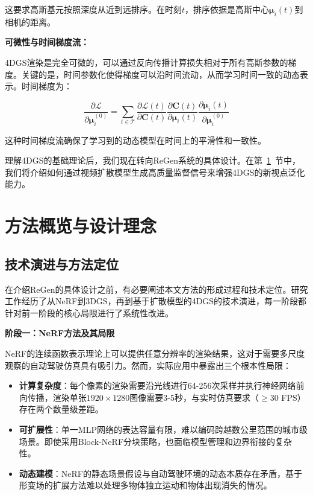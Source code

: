 这要求高斯基元按照深度从近到远排序。在时刻$t$，排序依据是高斯中心$\boldsymbol{\mu}_i(t)$到相机的距离。

\textbf{可微性与时间梯度流：}

4DGS渲染是完全可微的，可以通过反向传播计算损失相对于所有高斯参数的梯度。关键的是，时间参数化使得梯度可以沿时间流动，从而学习时间一致的动态表示。时间梯度为：

\begin{equation}
\frac{\partial \mathcal{L}}{\partial \boldsymbol{\mu}_i^{(0)}} = \sum_{t \in \mathcal{T}} \frac{\partial \mathcal{L}(t)}{\partial \mathbf{C}(t)} \frac{\partial \mathbf{C}(t)}{\partial \boldsymbol{\mu}_i(t)} \frac{\partial \boldsymbol{\mu}_i(t)}{\partial \boldsymbol{\mu}_i^{(0)}}
\label{eq:temporal_gradient}
\end{equation}

这种时间梯度流确保了学习到的动态模型在时间上的平滑性和一致性。

理解4DGS的基础理论后，我们现在转向ReGen系统的具体设计。在第~\ref{sec:method_overview}~节中，我们将介绍如何通过视频扩散模型生成高质量监督信号来增强4DGS的新视点泛化能力。

\section{方法概览与设计理念}
\label{sec:method_overview}

\subsection{技术演进与方法定位}

在介绍ReGen的具体设计之前，有必要阐述本文方法的形成过程和技术定位。研究工作经历了从NeRF到3DGS，再到基于扩散模型的4DGS的技术演进，每一阶段都针对前一阶段的核心局限进行了系统性改进。

\textbf{阶段一：NeRF方法及其局限}

NeRF的连续函数表示理论上可以提供任意分辨率的渲染结果，这对于需要多尺度观察的自动驾驶仿真具有吸引力。然而，实际应用中暴露出三个根本性局限：

\begin{itemize}
\item \textbf{计算复杂度}：每个像素的渲染需要沿光线进行64-256次采样并执行神经网络前向传播，渲染单张$1920 \times 1280$图像需要3-5秒，与实时仿真要求（$\geq$30 FPS）存在两个数量级差距。
\item \textbf{可扩展性}：单一MLP网络的表达容量有限，难以编码跨越数公里范围的城市级场景。即使采用Block-NeRF分块策略，也面临模型管理和边界衔接的复杂性。
\item \textbf{动态建模}：NeRF的静态场景假设与自动驾驶环境的动态本质存在矛盾，基于形变场的扩展方法难以处理多物体独立运动和物体出现消失的情况。
\end{itemize}

